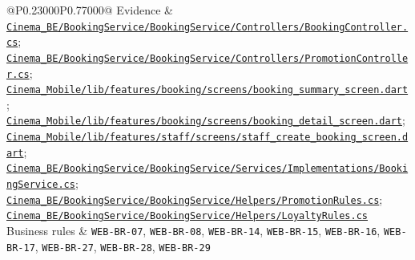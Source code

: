 \begin{longtable}{@{}P{0.23000\SRSWidth}P{0.77000\SRSWidth}@{}}
Evidence & \href{../../../Cinema\_BE/BookingService/BookingService/Controllers/BookingController.cs}{\texttt{Cinema\_\allowbreak{}BE/\allowbreak{}Booking\allowbreak{}Service/\allowbreak{}Booking\allowbreak{}Service/\allowbreak{}Controll\allowbreak{}ers/\allowbreak{}Booking\allowbreak{}Controll\allowbreak{}er.\allowbreak{}cs}}; \href{../../../Cinema\_BE/BookingService/BookingService/Controllers/PromotionController.cs}{\texttt{Cinema\_\allowbreak{}BE/\allowbreak{}Booking\allowbreak{}Service/\allowbreak{}Booking\allowbreak{}Service/\allowbreak{}Controll\allowbreak{}ers/\allowbreak{}Promotio\allowbreak{}n\allowbreak{}Controll\allowbreak{}er.\allowbreak{}cs}}; \href{../../../Cinema\_Mobile/lib/features/booking/screens/booking\_summary\_screen.dart}{\texttt{Cinema\_\allowbreak{}Mobile/\allowbreak{}lib/\allowbreak{}features\allowbreak{}/\allowbreak{}booking/\allowbreak{}screens/\allowbreak{}booking\_\allowbreak{}summary\_\allowbreak{}screen.\allowbreak{}dart}}; \href{../../../Cinema\_Mobile/lib/features/booking/screens/booking\_detail\_screen.dart}{\texttt{Cinema\_\allowbreak{}Mobile/\allowbreak{}lib/\allowbreak{}features\allowbreak{}/\allowbreak{}booking/\allowbreak{}screens/\allowbreak{}booking\_\allowbreak{}detail\_\allowbreak{}screen.\allowbreak{}dart}}; \href{../../../Cinema\_Mobile/lib/features/staff/screens/staff\_create\_booking\_screen.dart}{\texttt{Cinema\_\allowbreak{}Mobile/\allowbreak{}lib/\allowbreak{}features\allowbreak{}/\allowbreak{}staff/\allowbreak{}screens/\allowbreak{}staff\_\allowbreak{}create\_\allowbreak{}booking\_\allowbreak{}screen.\allowbreak{}dart}}; \href{../../../Cinema\_BE/BookingService/BookingService/Services/Implementations/BookingService.cs}{\texttt{Cinema\_\allowbreak{}BE/\allowbreak{}Booking\allowbreak{}Service/\allowbreak{}Booking\allowbreak{}Service/\allowbreak{}Services\allowbreak{}/\allowbreak{}Implemen\allowbreak{}tations/\allowbreak{}Booking\allowbreak{}Service.\allowbreak{}cs}}; \href{../../../Cinema\_BE/BookingService/BookingService/Helpers/PromotionRules.cs}{\texttt{Cinema\_\allowbreak{}BE/\allowbreak{}Booking\allowbreak{}Service/\allowbreak{}Booking\allowbreak{}Service/\allowbreak{}Helpers/\allowbreak{}Promotio\allowbreak{}n\allowbreak{}Rules.\allowbreak{}cs}}; \href{../../../Cinema\_BE/BookingService/BookingService/Helpers/LoyaltyRules.cs}{\texttt{Cinema\_\allowbreak{}BE/\allowbreak{}Booking\allowbreak{}Service/\allowbreak{}Booking\allowbreak{}Service/\allowbreak{}Helpers/\allowbreak{}Loyalty\allowbreak{}Rules.\allowbreak{}cs}} \\[3pt]
Business rules & \texttt{WEB-\allowbreak{}BR-\allowbreak{}07}, \texttt{WEB-\allowbreak{}BR-\allowbreak{}08}, \texttt{WEB-\allowbreak{}BR-\allowbreak{}14}, \texttt{WEB-\allowbreak{}BR-\allowbreak{}15}, \texttt{WEB-\allowbreak{}BR-\allowbreak{}16}, \texttt{WEB-\allowbreak{}BR-\allowbreak{}17}, \texttt{WEB-\allowbreak{}BR-\allowbreak{}27}, \texttt{WEB-\allowbreak{}BR-\allowbreak{}28}, \texttt{WEB-\allowbreak{}BR-\allowbreak{}29} \\[3pt]

\end{longtable}
